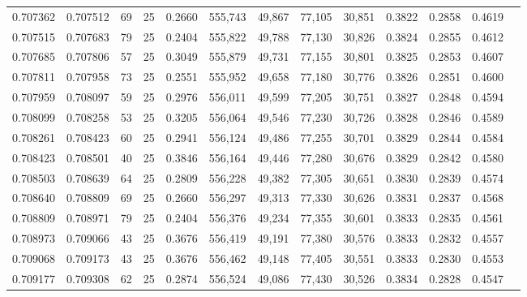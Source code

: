 \begin{tabular}{rrrrrrrrrrrrr}
0.707362 & 0.707512 &    69 &  25 &                                     0.2660 & 555,743 &  49,867 &  77,105 &  30,851 & 0.3822 & 0.2858 & 0.4619 \\
0.707515 & 0.707683 &    79 &  25 &                                     0.2404 & 555,822 &  49,788 &  77,130 &  30,826 & 0.3824 & 0.2855 & 0.4612 \\
0.707685 & 0.707806 &    57 &  25 &                                     0.3049 & 555,879 &  49,731 &  77,155 &  30,801 & 0.3825 & 0.2853 & 0.4607 \\
0.707811 & 0.707958 &    73 &  25 &                                     0.2551 & 555,952 &  49,658 &  77,180 &  30,776 & 0.3826 & 0.2851 & 0.4600 \\
0.707959 & 0.708097 &    59 &  25 &                                     0.2976 & 556,011 &  49,599 &  77,205 &  30,751 & 0.3827 & 0.2848 & 0.4594 \\
0.708099 & 0.708258 &    53 &  25 &                                     0.3205 & 556,064 &  49,546 &  77,230 &  30,726 & 0.3828 & 0.2846 & 0.4589 \\
0.708261 & 0.708423 &    60 &  25 &                                     0.2941 & 556,124 &  49,486 &  77,255 &  30,701 & 0.3829 & 0.2844 & 0.4584 \\
0.708423 & 0.708501 &    40 &  25 &                                     0.3846 & 556,164 &  49,446 &  77,280 &  30,676 & 0.3829 & 0.2842 & 0.4580 \\
0.708503 & 0.708639 &    64 &  25 &                                     0.2809 & 556,228 &  49,382 &  77,305 &  30,651 & 0.3830 & 0.2839 & 0.4574 \\
0.708640 & 0.708809 &    69 &  25 &                                     0.2660 & 556,297 &  49,313 &  77,330 &  30,626 & 0.3831 & 0.2837 & 0.4568 \\
0.708809 & 0.708971 &    79 &  25 &                                     0.2404 & 556,376 &  49,234 &  77,355 &  30,601 & 0.3833 & 0.2835 & 0.4561 \\
0.708973 & 0.709066 &    43 &  25 &                                     0.3676 & 556,419 &  49,191 &  77,380 &  30,576 & 0.3833 & 0.2832 & 0.4557 \\
0.709068 & 0.709173 &    43 &  25 &                                     0.3676 & 556,462 &  49,148 &  77,405 &  30,551 & 0.3833 & 0.2830 & 0.4553 \\
0.709177 & 0.709308 &    62 &  25 &                                     0.2874 & 556,524 &  49,086 &  77,430 &  30,526 & 0.3834 & 0.2828 & 0.4547 \\

\end{tabular}
